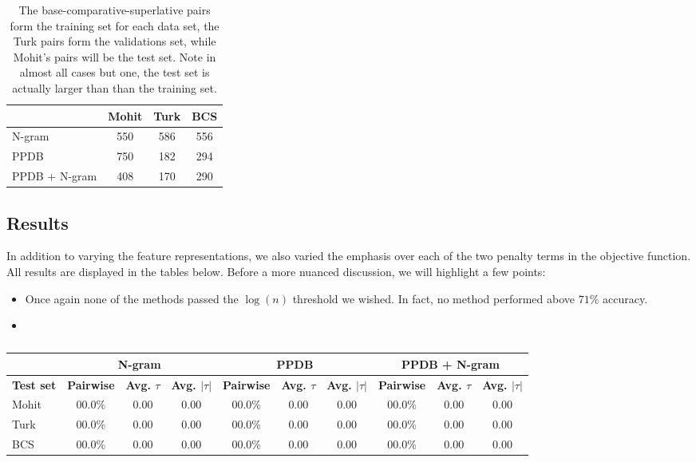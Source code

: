 \begin{table}
\small
\centering
\begin{tabular}{|l|c|c|c|}
	\hline 
	& \multicolumn{1}{c|}{Mohit} 
	& \multicolumn{1}{c|}{Turk} 
	& \multicolumn{1}{c|}{BCS} \\
	\hline 
	N-gram          & 550 & 586 & 556 \\
	PPDB            & 750 & 182 & 294 \\
	PPDB + N-gram   & 408 & 170 & 290 \\
	\hline
\end{tabular}
\caption{\label{font-table} The base-comparative-superlative pairs form the training set for each data set, the Turk pairs form the validations set, while Mohit's pairs will be the test set. Note in almost all cases but one, the test set is actually larger than than the training set. }
\end{table}


\subsection{Results}

In addition to varying the feature representations, we also varied the emphasis over each of the two penalty terms in the objective function. All results are displayed in the tables below. Before a more nuanced discussion, we will highlight a few points:

\begin{itemize}
	\item Once again none of the methods passed the $\log(n)$ threshold we wished. In fact, no method performed above $71\%$ accuracy.
	\item 
\end{itemize}


\begin{table}
\small
\centering
\begin{tabular}{|l|ccc|ccc|ccc|}
	\hline 
	& \multicolumn{3}{c|}{N-gram} 
	& \multicolumn{3}{c|}{PPDB} 
	& \multicolumn{3}{c|}{PPDB + N-gram} \\
	\hline 
	\bf Test set
	& \bf Pairwise & \bf Avg. $\tau$ & \bf Avg. $|\tau|$ 
	& \bf Pairwise & \bf Avg. $\tau$ & \bf Avg. $|\tau|$ 
	& \bf Pairwise & \bf Avg. $\tau$ & \bf Avg. $|\tau|$ \\ 
	\hline
	Mohit & 00.0\%  & 0.00 & 0.00  & 00.0\% & 0.00 & 0.00 & 00.0\% & 0.00 & 0.00 \\ 
	Turk  & 00.0\%  & 0.00 & 0.00  & 00.0\% & 0.00 & 0.00 & 00.0\% & 0.00 & 0.00 \\
	BCS   & 00.0\%  & 0.00 & 0.00  & 00.0\% & 0.00 & 0.00 & 00.0\% & 0.00 & 0.00 \\
	\hline
\end{tabular}
\caption{\label{font-table} }
\end{table}




















